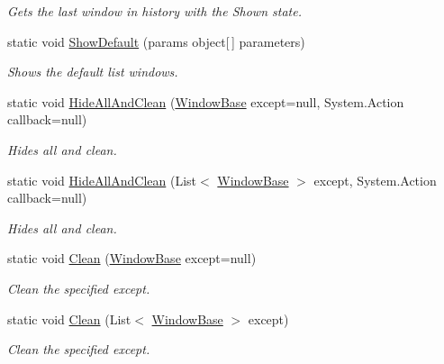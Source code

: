 \begin{DoxyCompactItemize}
\begin{DoxyCompactList}\small\item\em Gets the last window in history with the {\ttfamily Shown} state. \end{DoxyCompactList}\item 
static void \hyperlink{class_unity_engine_1_1_u_i_1_1_windows_1_1_window_system_afd54c11d5e6a149247a186ca0cf9c950}{Show\+Default} (params object\mbox{[}$\,$\mbox{]} parameters)
\begin{DoxyCompactList}\small\item\em Shows the default list windows. \end{DoxyCompactList}\item 
static void \hyperlink{class_unity_engine_1_1_u_i_1_1_windows_1_1_window_system_af764fd351b86d78b177a5139537f6c20}{Hide\+All\+And\+Clean} (\hyperlink{class_unity_engine_1_1_u_i_1_1_windows_1_1_window_base}{Window\+Base} except=null, System.\+Action callback=null)
\begin{DoxyCompactList}\small\item\em Hides all and clean. \end{DoxyCompactList}\item 
static void \hyperlink{class_unity_engine_1_1_u_i_1_1_windows_1_1_window_system_af31de6545d4232634b5c05bcf89a3406}{Hide\+All\+And\+Clean} (List$<$ \hyperlink{class_unity_engine_1_1_u_i_1_1_windows_1_1_window_base}{Window\+Base} $>$ except, System.\+Action callback=null)
\begin{DoxyCompactList}\small\item\em Hides all and clean. \end{DoxyCompactList}\item 
static void \hyperlink{class_unity_engine_1_1_u_i_1_1_windows_1_1_window_system_a2a48fd7de398f436f8c3d1be8e38bf38}{Clean} (\hyperlink{class_unity_engine_1_1_u_i_1_1_windows_1_1_window_base}{Window\+Base} except=null)
\begin{DoxyCompactList}\small\item\em Clean the specified except. \end{DoxyCompactList}\item 
static void \hyperlink{class_unity_engine_1_1_u_i_1_1_windows_1_1_window_system_acd7f456eaee6e79e1a0c5e3ebb9602c4}{Clean} (List$<$ \hyperlink{class_unity_engine_1_1_u_i_1_1_windows_1_1_window_base}{Window\+Base} $>$ except)
\begin{DoxyCompactList}\small\item\em Clean the specified except. \end{DoxyCompactList}\item 

\end{DoxyCompactItemize}
